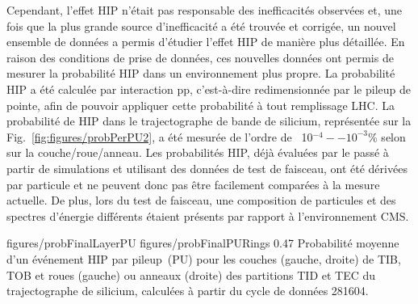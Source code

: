 
Cependant, l'effet HIP n'était pas responsable des inefficacités observées et, une fois que la plus grande source d'inefficacité a été trouvée et corrigée, un nouvel ensemble de données a permis d'étudier l'effet HIP de manière plus détaillée. En raison des conditions de prise de données, ces nouvelles données ont permis de mesurer la probabilité HIP dans un environnement plus propre. La probabilité HIP a été calculée par interaction pp, c'est-à-dire redimensionnée par le pileup de pointe, afin de pouvoir appliquer cette probabilité à tout remplissage LHC. La probabilité de HIP dans le trajectographe de bande de silicium, représentée sur la Fig.~\ref{fig:figures/probPerPU2}, a été mesurée de l'ordre de ~10$^{-4} -- 10^{-3}$\% selon sur la couche/roue/anneau. Les probabilités HIP, déjà évaluées par le passé à partir de simulations et utilisant des données de test de faisceau, ont été dérivées par particule et ne peuvent donc pas être facilement comparées à la mesure actuelle. De plus, lors du test de faisceau, une composition de particules et des spectres d'énergie différents étaient présents par rapport à l'environnement CMS.

                 {figures/probFinalLayerPU} %
                 {figures/probFinalPURings} %
                 {0.47}       %
                 { Probabilité moyenne d'un événement HIP par pileup~(PU) pour les couches (gauche, droite) de TIB, TOB et roues (gauche) ou anneaux (droite) des partitions TID et TEC du trajectographe de silicium, calculées à partir du cycle de données 281604.}

